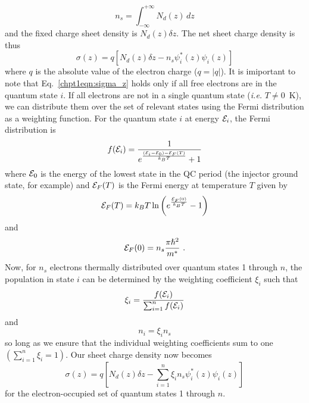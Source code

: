 \documentclass[12pt]{report}
\begin{document}
{\begin{equation}
n_s = \int_{-\infty}^{+\infty} \! N_d(z) \, dz
\end{equation}
and the fixed charge sheet density is $N_d(z) \delta\!z$.  The net sheet charge density is thus
\begin{equation}
\label{chpt1eqn:sigma_z}
\sigma(z) = q \left[N_d(z) \delta\!z - n_s \psi_i^*(z) \psi_i(z) \right]
\end{equation}
where $q$ is the absolute value of the electron charge ($q=|q|$). It is imiportant to note that Eq.~\eqref{chpt1eqn:sigma_z} holds only if all free electrons are in the quantum state $i$.  If all electrons are not in a single quantum state (\emph{i.e.} $T\neq0$~K), we can distribute them over the set of relevant states using the Fermi distribution as a weighting function.  For the quantum state $i$ at energy $\EE_i$, the Fermi distribution is
\begin{equation}
f(\EE_i) = \frac{1}{e^{\frac{(\EE_i-\EE_0)-\EE_{F}(T)}{k_{B} T}}+1}
\end{equation}
where $\EE_0$ is the energy of the lowest state in the QC period (the injector ground state, for example) and $\EE_{F}(T)$ is the Fermi energy at temperature $T$ given by \cite{Davies:book:1998}
\begin{equation}
\EE_{F}(T)=k_{B} T \ln\left(e^{\frac{\EE_{F}(0)}{k_{B} T}}-1\right)
\end{equation}
and
\begin{equation}
\EE_{F}(0)=n_s \frac{\pi \hslash^2}{m^*} \text{~.}
\end{equation}
Now, for $n_s$ electrons thermally distributed over quantum states 1 through $n$, the population in state $i$ can be determined by the weighting coefficient $\xi_i$ such that
\begin{equation}
\xi_i = \frac{f(\EE_i)}{\sum_{i=1}^{n} f(\EE_i)}
\end{equation}
and
\begin{equation}
n_i=\xi_i n_s
\end{equation}
so long as we ensure that the individual weighting coefficients sum to one $\left(\sum_{i=1}^{n} \xi_i = 1\right)$.
Our sheet charge density now becomes
\begin{equation}
\sigma(z) = q \left[N_d(z) \delta\!z - \sum_{i=1}^{n} \xi_i n_s \psi_i^*(z) \psi_i(z) \right]
\end{equation}
for the electron-occupied set of quantum states 1 through $n$.

}
\end{document}
